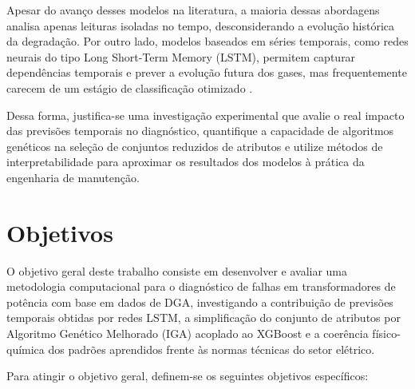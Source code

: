 Apesar do avanço desses modelos na literatura, a maioria dessas abordagens analisa apenas leituras isoladas no tempo, desconsiderando a evolução histórica da degradação. Por outro lado, modelos baseados em séries temporais, como redes neurais do tipo Long Short-Term Memory (LSTM), permitem capturar dependências temporais e prever a evolução futura dos gases, mas frequentemente carecem de um estágio de classificação otimizado \cite{wang2023}.

Dessa forma, justifica-se uma investigação experimental que avalie o real impacto das previsões temporais no diagnóstico, quantifique a capacidade de algoritmos genéticos na seleção de conjuntos reduzidos de atributos e utilize métodos de interpretabilidade para aproximar os resultados dos modelos à prática da engenharia de manutenção.

\section{Objetivos}\label{sec:objetivos}

O objetivo geral deste trabalho consiste em desenvolver e avaliar uma metodologia computacional para o diagnóstico de falhas em transformadores de potência com base em dados de DGA, investigando a contribuição de previsões temporais obtidas por redes LSTM, a simplificação do conjunto de atributos por Algoritmo Genético Melhorado (IGA) acoplado ao XGBoost e a coerência físico-química dos padrões aprendidos frente às normas técnicas do setor elétrico.

Para atingir o objetivo geral, definem-se os seguintes objetivos específicos:

